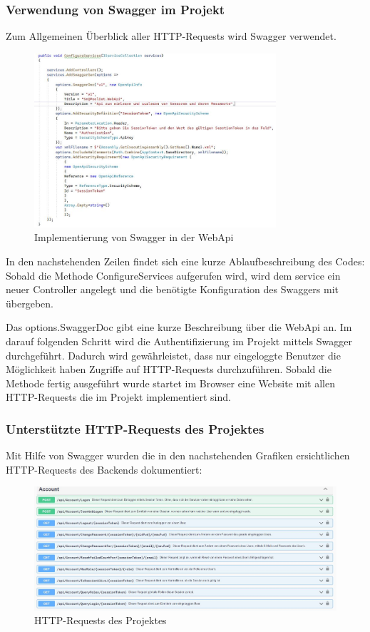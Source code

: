 \subsubsection*{Verwendung von Swagger im Projekt}
Zum Allgemeinen Überblick aller HTTP-Requests wird Swagger verwendet.

\begin{figure}[H]
    \centering
    \includegraphics[width=0.8\textwidth]{pics/SwaggerImplementation.JPG}
    \caption{Implementierung von Swagger in der WebApi}
\end{figure}

In den nachstehenden Zeilen findet sich eine kurze Ablaufbeschreibung des Codes:
Sobald die Methode ConfigureServices aufgerufen wird, wird dem service ein neuer Controller angelegt und die benötigte Konfiguration des Swaggers mit übergeben. 

Das options.SwaggerDoc gibt eine kurze Beschreibung über die WebApi an.
Im darauf folgenden Schritt wird die Authentifizierung im Projekt mittels Swagger durchgeführt. Dadurch wird gewährleistet, dass nur eingeloggte Benutzer die Möglichkeit haben Zugriffe auf HTTP-Requests durchzuführen.
Sobald die Methode fertig ausgeführt wurde startet im Browser eine Website mit allen HTTP-Requests die im Projekt implementiert sind.

\subsubsection*{Unterstützte HTTP-Requests des Projektes}
Mit Hilfe von Swagger wurden die in den nachstehenden Grafiken ersichtlichen HTTP-Requests des Backends dokumentiert:

\begin{figure}[H]
    \flushleft
    \includegraphics[width=1.6\textwidth]{pics/WebApiRequests1.JPG}
    \caption{HTTP-Requests des Projektes}
\end{figure}

